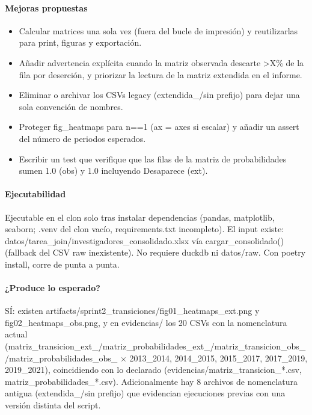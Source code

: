 \paragraph{Mejoras propuestas}
\begin{itemize}
  \item Calcular matrices una sola vez (fuera del bucle de impresión) y reutilizarlas para print, figuras y exportación.
  \item Añadir advertencia explícita cuando la matriz observada descarte >X\% de la fila por deserción, y priorizar la lectura de la matriz extendida en el informe.
  \item Eliminar o archivar los CSVs legacy (extendida\_/sin prefijo) para dejar una sola convención de nombres.
  \item Proteger fig\_heatmaps para n==1 (ax = axes si escalar) y añadir un assert del número de periodos esperados.
  \item Escribir un test que verifique que las filas de la matriz de probabilidades sumen 1.0 (obs) y 1.0 incluyendo Desaparece (ext).
\end{itemize}

\paragraph{Ejecutabilidad}
Ejecutable en el clon solo tras instalar dependencias (pandas, matplotlib, seaborn; .venv del clon vacío, requirements.txt incompleto). El input existe: datos/tarea\_join/investigadores\_consolidado.xlsx vía cargar\_consolidado() (fallback del CSV raw inexistente). No requiere duckdb ni datos/raw. Con poetry install, corre de punta a punta.

\paragraph{¿Produce lo esperado?}
SÍ: existen artifacts/sprint2\_transiciones/fig01\_heatmaps\_ext.png y fig02\_heatmaps\_obs.png, y en evidencias/ los 20 CSVs con la nomenclatura actual (matriz\_transicion\_ext\_/matriz\_probabilidades\_ext\_/matriz\_transicion\_obs\_/matriz\_probabilidades\_obs\_ $\times$ 2013\_2014, 2014\_2015, 2015\_2017, 2017\_2019, 2019\_2021), coincidiendo con lo declarado (evidencias/matriz\_transicion\_*.csv, matriz\_probabilidades\_*.csv). Adicionalmente hay 8 archivos de nomenclatura antigua (extendida\_/sin prefijo) que evidencian ejecuciones previas con una versión distinta del script.

